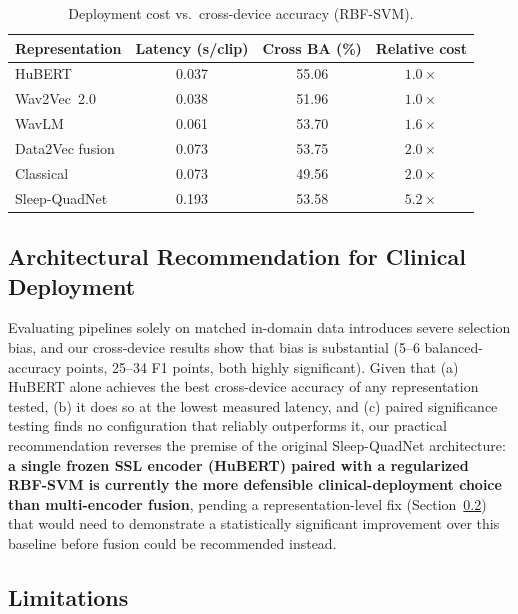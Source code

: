 \documentclass[conference]{IEEEtran}
\begin{document}
\begin{table}[!t]
\centering
\caption{Deployment cost vs.\ cross-device accuracy (RBF-SVM).}
\label{tab:deployment_cost}
\scriptsize
\begin{tabular}{lccc}
\toprule
\textbf{Representation} & \textbf{Latency (s/clip)} & \textbf{Cross BA (\%)} & \textbf{Relative cost} \\
\midrule
HuBERT         & 0.037 & 55.06 & $1.0\times$ \\
Wav2Vec~2.0    & 0.038 & 51.96 & $1.0\times$ \\
WavLM          & 0.061 & 53.70 & $1.6\times$ \\
Data2Vec fusion& 0.073 & 53.75 & $2.0\times$ \\
Classical      & 0.073 & 49.56 & $2.0\times$ \\
Sleep-QuadNet  & 0.193 & 53.58 & $5.2\times$ \\
\bottomrule
\end{tabular}
\end{table}

\subsection{Architectural Recommendation for Clinical Deployment}

Evaluating pipelines solely on matched in-domain data introduces severe selection bias, and our cross-device results show that bias is substantial (5--6 balanced-accuracy points, 25--34 F1 points, both highly significant). Given that (a) HuBERT alone achieves the best cross-device accuracy of any representation tested, (b) it does so at the lowest measured latency, and (c) paired significance testing finds no configuration that reliably outperforms it, our practical recommendation reverses the premise of the original Sleep-QuadNet architecture: \textbf{a single frozen SSL encoder (HuBERT) paired with a regularized RBF-SVM is currently the more defensible clinical-deployment choice than multi-encoder fusion}, pending a representation-level fix (Section~\ref{sec:limitations}) that would need to demonstrate a statistically significant improvement over this baseline before fusion could be recommended instead.

\subsection{Limitations}
\label{sec:limitations}
\end{document}
